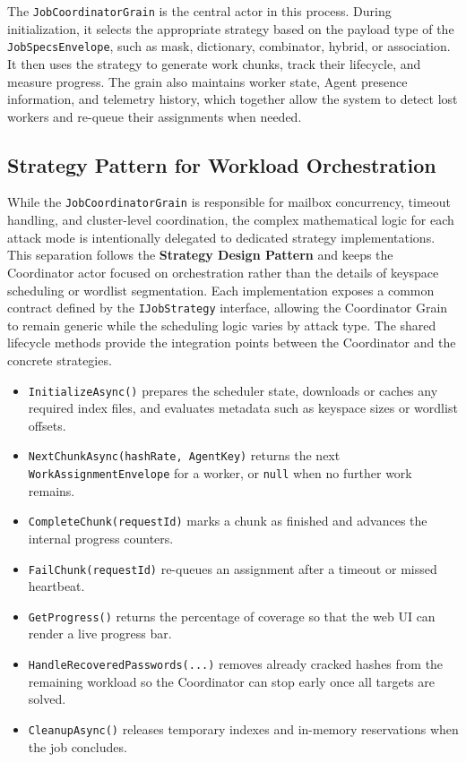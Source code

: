 The \verb|JobCoordinatorGrain| is the central actor in this process. During initialization, it selects the appropriate strategy based on the payload type of the \verb|JobSpecsEnvelope|, such as mask, dictionary, combinator, hybrid, or association. It then uses the strategy to generate work chunks, track their lifecycle, and measure progress. The grain also maintains worker state, Agent presence information, and telemetry history, which together allow the system to detect lost workers and re-queue their assignments when needed.

\subsection{Strategy Pattern for Workload Orchestration}

While the \verb|JobCoordinatorGrain| is responsible for mailbox concurrency, timeout handling, and cluster-level coordination, the complex mathematical logic for each attack mode is intentionally delegated to dedicated strategy implementations. This separation follows the \textbf{Strategy Design Pattern} \cite{enwiki:1316974000} and keeps the Coordinator actor focused on orchestration rather than the details of keyspace scheduling or wordlist segmentation. Each implementation exposes a common contract defined by the \verb|IJobStrategy| interface, allowing the Coordinator Grain to remain generic while the scheduling logic varies by attack type. The shared lifecycle methods provide the integration points between the Coordinator and the concrete strategies.

\begin{itemize}
    \item \verb|InitializeAsync()| prepares the scheduler state, downloads or caches any required index files, and evaluates metadata such as keyspace sizes or wordlist offsets.
    \item \verb|NextChunkAsync(hashRate, AgentKey)| returns the next \verb|WorkAssignmentEnvelope| for a worker, or \verb|null| when no further work remains.
    \item \verb|CompleteChunk(requestId)| marks a chunk as finished and advances the internal progress counters.
    \item \verb|FailChunk(requestId)| re-queues an assignment after a timeout or missed heartbeat.
    \item \verb|GetProgress()| returns the percentage of coverage so that the web UI can render a live progress bar.
    \item \verb|HandleRecoveredPasswords(...)| removes already cracked hashes from the remaining workload so the Coordinator can stop early once all targets are solved.
    \item \verb|CleanupAsync()| releases temporary indexes and in-memory reservations when the job concludes.
\end{itemize}

